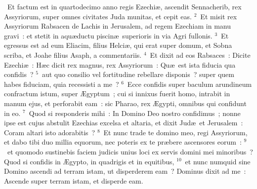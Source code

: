 ~\lettrine[lines=10,image=true,loversize=0.05,lraise=-0.03]{E}{}t factum est in quartodecimo anno regis Ezechi\ae , ascendit Sennacherib, rex Assyriorum, super omnes civitates Juda munitas, et cepit eas.
${}^{2}$~Et misit rex Assyriorum Rabsacen de Lachis in Jerusalem, ad regem Ezechiam in manu gravi~: et stetit in aqu\ae ductu piscin\ae\ superioris in via Agri fullonis.
${}^{3}$~Et egressus est ad eum Eliacim, filius Helci\ae , qui erat super domum, et Sobna scriba, et Joahe filius Asaph, a commentariis.
${}^{4}$~Et dixit ad eos Rabsaces~: Dicite Ezechi\ae~: H\ae c dicit rex magnus, rex Assyriorum~: Qu\ae\ est ista fiducia qua confidis~?
${}^{5}$~aut quo consilio vel fortitudine rebellare disponis~? super quem habes fiduciam, quia recessisti a me~?
${}^{6}$~Ecce confidis super baculum arundineum confractum istum, super \AE gyptum~; cui si innixus fuerit homo, intrabit in manum ejus, et perforabit eam~: sic Pharao, rex \AE gypti, omnibus qui confidunt in eo.
${}^{7}$~Quod si responderis mihi~: In Domino Deo nostro confidimus~; nonne ipse est cujus abstulit Ezechias excelsa et altaria, et dixit Jud\ae\ et Jerusalem~: Coram altari isto adorabitis~?
${}^{8}$~Et nunc trade te domino meo, regi Assyriorum, et dabo tibi duo millia equorum, nec poteris ex te pr\ae bere ascensores eorum~:
${}^{9}$~et quomodo sustinebis faciem judicis unius loci ex servis domini mei minoribus~? Quod si confidis in \AE gypto, in quadrigis et in equitibus,
${}^{10}$~et nunc numquid sine Domino ascendi ad terram istam, ut disperderem eam~? Dominus dixit ad me~: Ascende super terram istam, et disperde eam.


